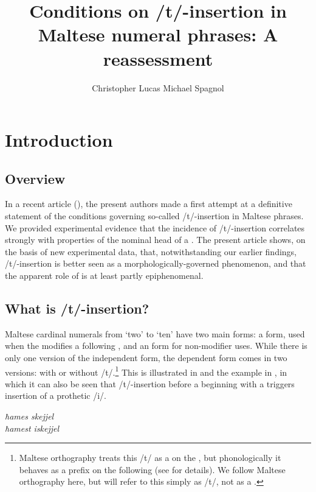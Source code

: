 \documentclass[output=paper]{langsci/langscibook}
\author{Christopher Lucas \affiliation{SOAS, University of London}\lastand
Michael Spagnol\affiliation{University of Malta}
}
\title{Conditions on /t/-insertion in Maltese numeral phrases: {A} reassessment}
\begin{document}

\section{Introduction}
\subsection{Overview}

In a recent article (\citealt{LucasSpagnol2016}), the present authors made a first attempt at a definitive statement of the conditions governing so-called /t/-insertion in Maltese  phrases. We provided experimental evidence that the incidence of /t/-insertion correlates strongly with  properties of the nominal head of a  . The present article shows, on the basis of new experimental data, that, notwithstanding our earlier findings, /t/-insertion is better seen as a morphologically-governed phenomenon, and that the apparent role of  is at least partly epiphenomenal.

\subsection{What is /t/-insertion?}

Maltese cardinal numerals from ‘two’ to ‘ten’ have two main forms: a  form, used when the  modifies a following , and an  form for non-modifier uses. While there is only one version of the independent form, the dependent form comes in two versions: with or without /t/.\footnote{Maltese orthography treats this /t/ as a  on the , but phonologically it behaves as a prefix on the following  (see \citealt{LucasSpagnol2016} for details). We follow Maltese orthography here, but will refer to this  simply as /t/, not as a .}  This is illustrated in  and the example in ‎, in which it can also be seen that /t/-insertion before a  beginning with a  triggers insertion of a prothetic /i/.

\ea\label{ex:lucas:1}
\ea
{ \textit{ħames      skejjel}}\\
\ex 
{ \textit{ħamest      iskejjel}}\\
 
\z
\z
\end{document}
